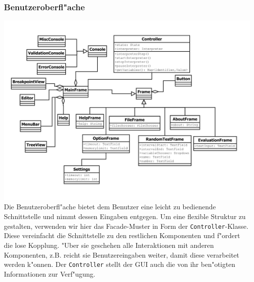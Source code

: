 \documentclass[10pt,a4paper,titlepage]{article}
\begin{document}
\subsubsection{Benutzeroberfl"ache}

\includegraphics[scale=0.85]{images/GUI.pdf} \\
Die Benutzeroberfl"ache bietet dem Benutzer eine leicht zu bedienende Schnittstelle und nimmt dessen Eingaben entgegen. Um eine flexible Struktur zu gestalten, verwenden wir hier das Facade-Muster in Form der \texttt{Controller}-Klasse. Diese vereinfacht die Schnittstelle zu den restlichen Komponenten und f"ordert die lose Kopplung. "Uber sie geschehen alle Interaktionen mit anderen Komponenten, z.B. reicht sie Benutzereingaben weiter, damit diese verarbeitet werden k"onnen. Der \texttt{Controller} stellt der GUI auch die von ihr ben"otigten Informationen zur Verf"ugung. 
\end{document}
